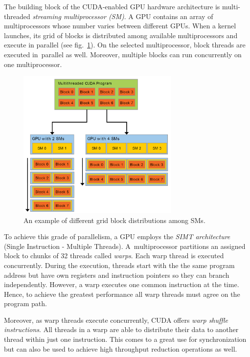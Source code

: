 The building block of the CUDA-enabled GPU hardware architecture is multi-threaded \emph{streaming multiprocessor (SM)}. A GPU contains an array of multiprocessors whose number varies between different GPUs. When a kernel launches, its grid of blocks is distributed among available multiprocessors and execute in parallel (see fig.~\ref{fig02:SM}). On the selected multiprocessor, block threads are executed in~parallel as well. Moreover, multiple blocks can run concurrently on one multiprocessor.

\begin{figure}\centering
	\includegraphics[width=8cm]{img/SM}
	\caption{An example of different grid block distributions among SMs. }
	\label{fig02:SM}
\end{figure}

To achieve this grade of parallelism, a GPU employs the \emph{SIMT architecture} (Single Instruction - Multiple Threads). A~multiprocessor partitions an assigned block to chunks of 32 threads called \emph{warps}. Each warp thread is executed concurrently. During the execution, threads start with the the same program address but have own registers and instruction pointers so they can branch independently. However, a warp executes one common instruction at the time. Hence, to achieve the greatest performance all warp threads must agree on the program path.

Moreover, as warp threads execute concurrently, CUDA offers \emph{warp shuffle instructions}. All threads in a warp are able to distribute their data to another thread within just one instruction. This comes to a great use for synchronization but can also be used to achieve high throughput reduction operations as well.


